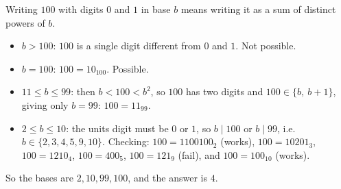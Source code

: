 Writing $100$ with digits $0$ and $1$ in base $b$ means writing it as a sum of distinct powers of $b$.
\begin{itemize}
\item $b>100$: $100$ is a single digit different from $0$ and $1$. Not possible.
\item $b=100$: $100=10_{100}$. Possible.
\item $11\le b\le 99$: then $b<100<b^2$, so $100$ has two digits and $100\in\{b,\ b+1\}$, giving only $b=99$: $100=11_{99}$.
\item $2\le b\le10$: the units digit must be $0$ or $1$, so $b\mid100$ or $b\mid99$, i.e.\ $b\in\{2,3,4,5,9,10\}$. Checking: $100=1100100_2$ (works), $100=10201_3$, $100=1210_4$, $100=400_5$, $100=121_9$ (fail), and $100=100_{10}$ (works).
\end{itemize}
So the bases are $2,10,99,100$, and the answer is $\boxed{4}$.

